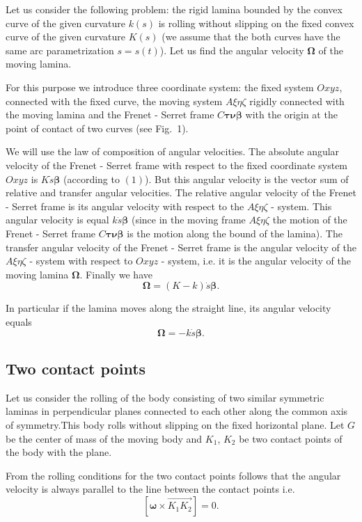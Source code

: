 \documentclass[10pt]{enoc2011}
\renewcommand{\vec}[1]{\boldsymbol{#1}}
\begin{document}
Let us consider the following problem: the rigid lamina bounded by the convex curve of the given curvature $k(s)$ is rolling without slipping on the fixed convex curve of the given curvature $K(s)$ (we assume that the both curves have the same arc parametrization $s=s(t)$). Let us find the angular velocity $\vec\Omega$ of the moving lamina.

For this purpose we introduce three coordinate system: the fixed system $Oxyz$, connected with the fixed curve, the moving system $A\xi\eta\zeta$ rigidly connected with the moving lamina and the Frenet - Serret frame $C\vec\tau\vec\nu\vec\beta$ with the origin at the point of contact of two curves (see Fig.~1).

We will use the law of composition of angular velocities. The absolute angular velocity of the Frenet - Serret frame with respect to the fixed coordinate system $Oxyz$ is $K\dot{s}\vec\beta$ (according to $(1)$). But this angular velocity is the vector sum of relative and transfer angular velocities. The relative angular velocity of the Frenet - Serret frame is its angular velocity with respect to the $A\xi\eta\zeta$ - system. This angular velocity is equal $k\dot{s}\vec\beta$ (since in the moving frame $A\xi\eta\zeta$ the motion of the Frenet - Serret frame $C\vec\tau\vec\nu\vec\beta$ is the motion along the bound of the lamina). The transfer angular velocity of the Frenet - Serret frame is the angular velocity of the $A\xi\eta\zeta$ - system with respect to $Oxyz$ - system, i.e. it is the angular velocity of the moving lamina $\vec\Omega$. Finally we have
$$
\vec\Omega=\left(K-k\right)\dot{s}\vec\beta.
$$

In particular if the lamina moves along the straight line, its angular velocity equals
$$
\vec\Omega=-k\dot{s}\vec\beta.
$$

\subsection*{Two contact points}

Let us consider the rolling of the body consisting of two similar symmetric laminas in perpendicular planes connected to each other along the common axis of symmetry.This body rolls without slipping on the fixed horizontal plane. Let $G$ be the center of mass of the moving body and $K_1$, $K_2$ be two contact points of the body with the plane.

From the rolling conditions for the two contact points follows that the angular velocity is always parallel to the line between the contact points i.e.
$$
\left[\vec\omega\times\overrightarrow{K_1K_2}\right]=0.
$$
\end{document}
